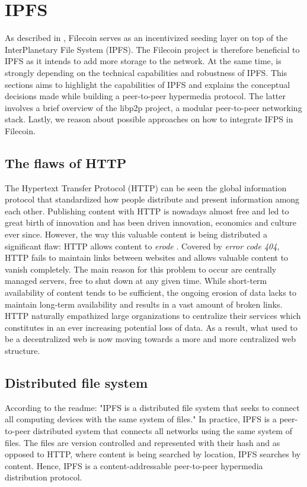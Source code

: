 \documentclass[conference]{IEEEtran}
\begin{document}
\section{IPFS}
As described in \cite{filecoin}, Filecoin serves as an incentivized seeding layer on top of the InterPlanetary File System (IPFS)\cite{ipfs-whitepaper}.
The Filecoin project is therefore beneficial to IPFS as it intends to add more storage to the network. At the same time, is strongly depending on the technical capabilities and robustness of IPFS.
This sections aims to highlight the capabilities of IPFS and explains the conceptual decisions made while building a peer-to-peer hypermedia protocol.
The latter involves a brief overview of the libp2p project\cite{libp2p}, a modular peer-to-peer networking stack.
Lastly, we reason about possible approaches on how to integrate IFPS in Filecoin.

\subsection{The flaws of HTTP}
The Hypertext Transfer Protocol (HTTP) can be seen the global information protocol that standardized how people distribute and present information among each other.
Publishing content with HTTP is nowadays almost free and led to great birth of innovation and has been driven innovation, economics and culture ever since.
However, the way this valuable content is being distributed a significant flaw: HTTP allows content to \textit{erode} \cite{http-obsolete}.
Covered by \textit{error code 404}\cite{http-rfc}, HTTP fails to maintain links between websites and allows valuable content to vanish completely.
The main reason for this problem to occur are centrally managed servers, free to shut down at any given time.
While short-term availability of content tends to be sufficient, the ongoing erosion of data lacks to maintain long-term availability and results in a vast amount of broken links\cite{broken-links}.
HTTP naturally empathized large organizations to centralize their services which constitutes in an ever increasing potential loss of data.
As a result, what used to be a decentralized web is now moving towards a more and more centralized web structure.

\subsection{Distributed file system}
\label{subsec:ipfs-dfs}
According to the readme\cite{ipfs-github}: "IPFS is a distributed file system that seeks to connect all computing devices with the same system of files."
In practice, IPFS is a peer-to-peer distributed system that connects all networks using the same system of files. 
The files are version controlled and represented with their hash and as opposed to HTTP, where content is being searched by location, IPFS searches by content.
Hence, IPFS is a content-addressable peer-to-peer hypermedia distribution protocol.
\end{document}
